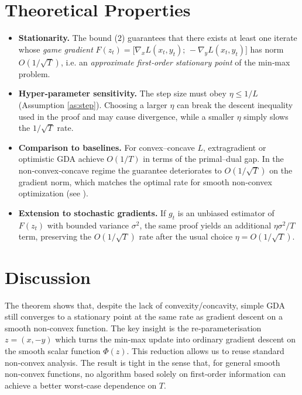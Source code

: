 \documentclass{article}
\begin{document}
\section*{Theoretical Properties}
\begin{itemize}
\item \textbf{Stationarity.} The bound (2) guarantees that there exists at least one iterate whose \emph{game gradient}
\(
F(z_t)=\bigl[\nabla_x L(x_t,y_t);\,-\nabla_y L(x_t,y_t)\bigr]
\)
has norm $O(1/\sqrt{T})$, i.e. an \emph{approximate first‑order stationary point} of the min‑max problem.

\item \textbf{Hyper‑parameter sensitivity.}
The step size must obey $\eta\le 1/L$ (Assumption \ref{as:step}). Choosing a larger $\eta$ can break the descent inequality used in the proof and may cause divergence, while a smaller $\eta$ simply slows the $1/\sqrt{T}$ rate.

\item \textbf{Comparison to baselines.}
For convex–concave $L$, extragradient or optimistic GDA achieve $O(1/T)$ in terms of the primal–dual gap. In the non‑convex‑concave regime the guarantee deteriorates to $O(1/\sqrt{T})$ on the gradient norm, which matches the optimal rate for smooth non‑convex optimization (see \cite{ghadimi2013stochastic}).

\item \textbf{Extension to stochastic gradients.}
If $g_t$ is an unbiased estimator of $F(z_t)$ with bounded variance $\sigma^2$, the same proof yields an additional $\eta\sigma^2/T$ term, preserving the $O(1/\sqrt{T})$ rate after the usual choice $\eta=O(1/\sqrt{T})$.
\end{itemize}

\section*{Discussion}
The theorem shows that, despite the lack of convexity/concavity, simple GDA still converges to a stationary point at the same rate as gradient descent on a smooth non‑convex function. The key insight is the re‑parameterisation $z=(x,-y)$ which turns the min‑max update into ordinary gradient descent on the smooth scalar function $\Phi(z)$. This reduction allows us to reuse standard non‑convex analysis. The result is tight in the sense that, for general smooth non‑convex functions, no algorithm based solely on first‑order information can achieve a better worst‑case dependence on $T$.
\end{document}
